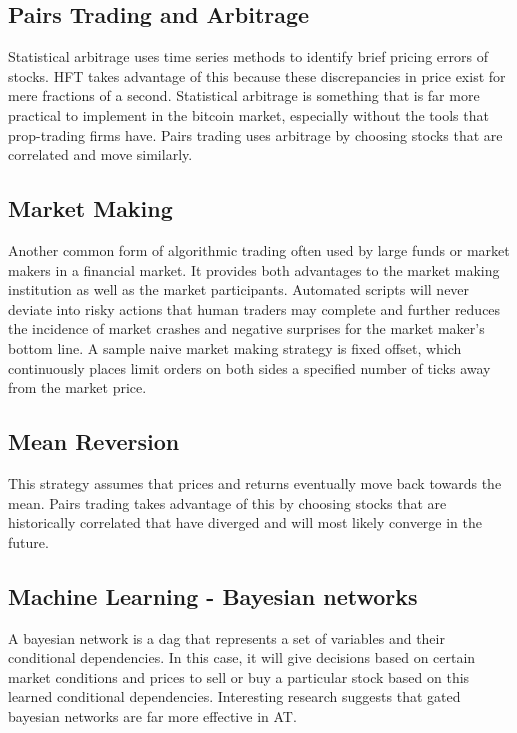 \documentclass[letterpaper,11pt]{article}
\begin{document}
\subsection*{Pairs Trading and Arbitrage}

Statistical arbitrage uses time series methods to identify brief pricing errors of stocks. HFT takes advantage of this because these discrepancies in price exist for mere fractions of a second. Statistical arbitrage is something that is far more practical to implement in the bitcoin market, especially without the tools that prop-trading firms have. Pairs trading uses arbitrage by choosing stocks that are correlated and move similarly. 

\subsection*{Market Making}

Another common form of algorithmic trading often used by large funds or market makers in a financial market. It provides both advantages to the market making institution as well as the market participants. Automated scripts will never deviate into risky actions that human traders may complete and further reduces the incidence of market crashes and negative surprises for the market maker's bottom line. A sample naive market making strategy is fixed offset, which continuously places limit orders on both sides a specified number of ticks away from the market price.

\subsection*{Mean Reversion}

This strategy assumes that prices and returns eventually move back towards the mean. Pairs trading takes advantage of this by choosing stocks that are historically correlated that have diverged and will most likely converge in the future. 

\subsection*{Machine Learning - Bayesian networks}

A bayesian network is a dag that represents a set of variables and their conditional dependencies. In this case, it will give decisions based on certain market conditions and prices to sell or buy a particular stock based on this learned conditional dependencies. Interesting research suggests that gated bayesian networks are far more effective in AT. 
\end{document}
